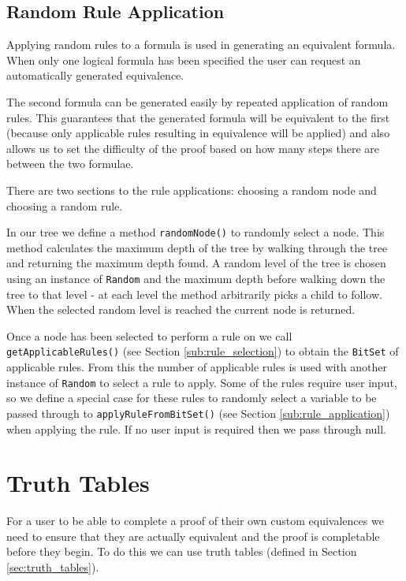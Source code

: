 \documentclass{report}
\begin{document}
\subsection{Random Rule Application}

Applying random rules to a formula is used in generating an equivalent formula. When only one logical formula has been specified the user can request an automatically generated equivalence.

The second formula can be generated easily by repeated application of random rules. This guarantees that the generated formula will be equivalent to the first (because only applicable rules resulting in equivalence will be applied) and also allows us to set the difficulty of the proof based on how many steps there are between the two formulae.

There are two sections to the rule applications: choosing a random node and choosing a random rule. 

In our tree we define a method {\tt randomNode()} to randomly select a node. This method calculates the maximum depth of the tree by walking through the tree and returning the maximum depth found. A random level of the tree is chosen using an instance of {\tt Random} and the maximum depth before walking down the tree to that level - at each level the method arbitrarily picks a child to follow. When the selected random level is reached the current node is returned.

Once a node has been selected to perform a rule on we call {\tt getApplicableRules()} (see Section \ref{sub:rule_selection}) to obtain the {\tt BitSet} of applicable rules. From this the number of applicable rules is used with another instance of {\tt Random} to select a rule to apply. Some of the rules require user input, so we define a special case for these rules to randomly select a variable to be passed through to {\tt applyRuleFromBitSet()} (see Section \ref{sub:rule_application}) when applying the rule. If no user input is required then we pass through null.

\section{Truth Tables}
\label{sec:generating_truth_tables}

For a user to be able to complete a proof of their own custom equivalences we need to ensure that they are actually equivalent and the proof is completable before they begin. To do this we can use truth tables (defined in Section \ref{sec:truth_tables}).
\end{document}
